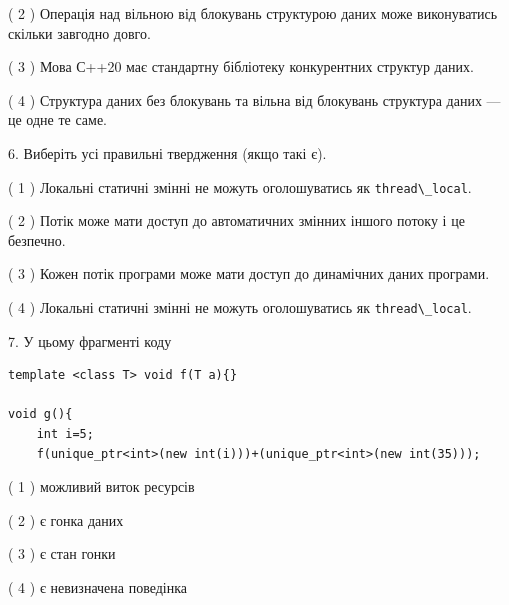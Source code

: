 \documentclass[12pt, ukrainian]{article}
\def\code#1{\Verb!#1!}
\begin{document}
\begin {large}
{( 2 ) Операція над вільною від блокувань структурою даних може виконуватись скільки завгодно довго.%

( 3 ) Мова С++20 має стандартну бібліотеку конкурентних структур даних.%

( 4 ) Структура даних без блокувань та вільна від блокувань структура даних --- це одне те саме.%
\newpage



\vspace{5mm}
6. Виберіть усі правильні твердження (якщо такі є).\par
\vspace{2mm}

( 1 ) Локальні статичні змінні не можуть оголошуватись як \code{thread\_local}.%

( 2 ) Потік може мати доступ до автоматичних змінних іншого потоку і це безпечно.%

( 3 ) Кожен потік програми може мати доступ до динамічних даних програми.%

( 4 ) Локальні статичні змінні не можуть оголошуватись як \code{thread\_local}.%


\vspace{5mm}
7. У цьому фрагменті коду
\begin{verbatim}
template <class T> void f(T a){}

void g(){
    int i=5;
    f(unique_ptr<int>(new int(i)))+(unique_ptr<int>(new int(35)));
\end{verbatim}
( 1 ) можливий виток ресурсів%

( 2 ) є гонка даних%

( 3 ) є стан гонки%

( 4 ) є невизначена поведінка%
}
\end {large}
\end{document}
